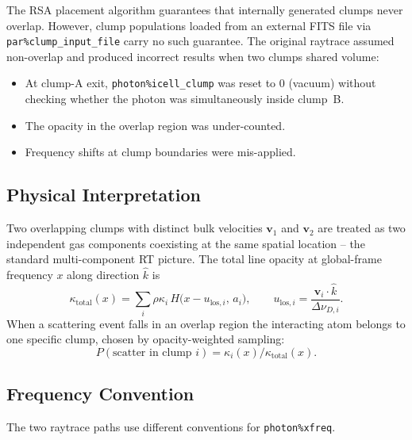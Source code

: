 \documentclass[english,a4paper]{my_memo}
\begin{document}
The RSA placement algorithm guarantees that internally generated clumps
never overlap.  However, clump populations loaded from an external FITS
file via \texttt{par\%clump\_input\_file} carry no such guarantee.  The
original raytrace assumed non-overlap and produced incorrect results
when two clumps shared volume:
\begin{itemize}
\item At clump-A exit, \texttt{photon\%icell\_clump} was reset to $0$ (vacuum)
      without checking whether the photon was simultaneously inside clump~B.
\item The opacity in the overlap region was under-counted.
\item Frequency shifts at clump boundaries were mis-applied.
\end{itemize}

\subsection{Physical Interpretation}

Two overlapping clumps with distinct bulk velocities $\boldsymbol{v}_1$ and
$\boldsymbol{v}_2$ are treated as two independent gas components coexisting
at the same spatial location -- the standard multi-component RT picture.
The total line opacity at global-frame frequency $x$ along direction
$\hat{k}$ is
\begin{equation}
  \kappa_\mathrm{total}(x)
  = \sum_i \rho\kappa_i\, H\!\bigl(x - u_{\mathrm{los},i},\, a_i\bigr),
  \qquad u_{\mathrm{los},i} = \frac{\boldsymbol{v}_i \cdot \hat{k}}{\Delta\nu_{D,i}}.
\end{equation}
When a scattering event falls in an overlap region the interacting atom
belongs to one specific clump, chosen by opacity-weighted sampling:
\begin{equation}
  P(\text{scatter in clump }i) = \kappa_i(x) / \kappa_\mathrm{total}(x).
\end{equation}

\subsection{Frequency Convention}
\label{sec:xfreq_convention}

The two raytrace paths use different conventions for \texttt{photon\%xfreq}.
\end{document}
